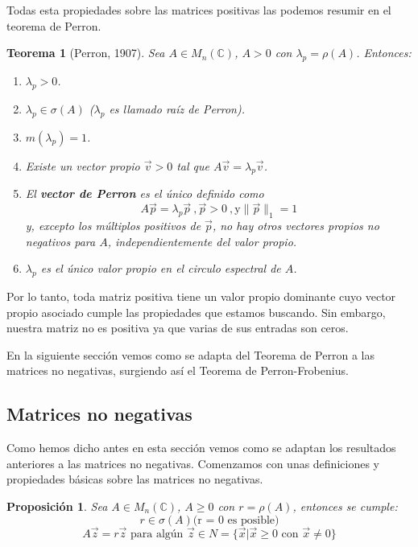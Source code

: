 \documentclass[size=a4, parskip=half, titlepage=false, toc=flat, toc=bib, 12pt, twoside]{scrartcl}
\theoremstyle{theorem-style}
\newtheorem{nth}{Teorema}[section]
\newtheorem{nprop}{Proposición}[section]
\theoremstyle{definition-style}
\theoremstyle{remark-style}
\theoremstyle{example-style}
\theoremstyle{definition-style}
\theoremstyle{remark-style}
\begin{document}
Todas esta propiedades sobre las matrices positivas las podemos resumir en el teorema de Perron.

\begin{nth}[Perron, 1907]
\label{perron}
Sea $A \in M_n(\mathbb{C})$, $A > 0$ con $\lambda_p = \rho(A)$. Entonces:
\begin{enumerate}
\item $\lambda_p >0$.
\item $\lambda_p \in \sigma(A)$ ($\lambda_p$ es llamado raíz de Perron).
\item $m(\lambda_p) = 1$.
\item Existe un vector propio $\vec{v} >0$ tal que $A\vec{v} = \lambda_p \vec{v}$.
\item El \textbf{vector de Perron} es el único definido como
$$A\vec{p} = \lambda_p \vec{p} \ , \vec{p} > 0 \ , \textrm{y} \|\vec{p}\|_1 = 1 $$
y, excepto los múltiplos positivos de $\vec{p}$, no hay otros vectores propios no negativos para $A$, independientemente del valor propio.
\item $\lambda_p$ es el único valor propio en el circulo espectral de $A$.
\end{enumerate}
\end{nth}

Por lo tanto, toda matriz positiva tiene un valor propio dominante cuyo vector propio asociado cumple las propiedades que estamos buscando. Sin embargo, nuestra matriz no es positiva ya que varias de sus entradas son ceros.

En la siguiente sección vemos como se adapta del Teorema de Perron a las matrices no negativas, surgiendo así el Teorema de Perron-Frobenius.

\subsection{Matrices no negativas}

Como hemos dicho antes en esta sección vemos como se adaptan los resultados anteriores a las matrices no negativas. Comenzamos con unas definiciones y propiedades básicas sobre las matrices no negativas.

\begin{nprop}
\label{geq}
Sea $A \in M_n(\mathbb{C})$, $A \geq 0$ con $r = \rho(A)$, entonces se cumple:
\begin{equation} r \in \sigma(A) \textrm{(r = 0 es posible)} \end{equation}
\begin{equation} \label{vectorpropio} A\vec{z} = r\vec{z} \textrm{ para algún } \vec{z} \in N = \{\vec{x} | \vec{x} \geq 0 \textrm{ con } \vec{x} \neq 0 \} \end{equation}
\end{nprop}
\end{document}
